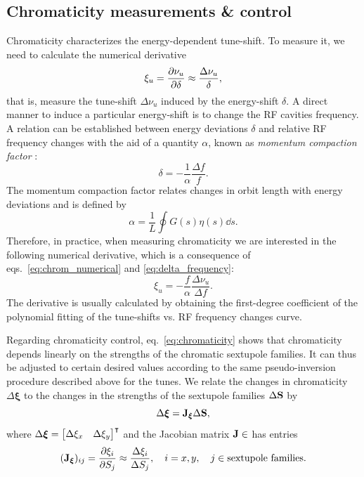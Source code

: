 \subsection{Chromaticity measurements \& control}
Chromaticity characterizes the energy-dependent tune-shift. To measure it, we need to calculate the numerical derivative
\begin{equation}
    \xi_u = \pdv{\nu_u}{\delta}\approx \frac{\Delta \nu_u}{\delta},
    \label{eq:chrom_numerical}
\end{equation}
that is, measure the tune-shift $\Delta \nu_u$ induced by the energy-shift $\delta$. A direct manner to induce a particular energy-shift is to change the RF cavities frequency. A relation can be established between energy deviations $\delta$ and relative RF frequency changes with the aid of a quantity $\alpha$, known as \textit{momentum compaction factor} \cite{lee_accelerator_2004,sands_physics_1969}:
\begin{equation}
    \delta = -\frac{1}{\alpha}\frac{\Delta f}{f}.
    \label{eq:delta_frequency}
\end{equation}
The momentum compaction factor relates changes in orbit length with energy deviations and is defined by
\begin{equation}
    \alpha = \frac{1}{L}\oint G(s) \eta(s) \dd{s}.
\end{equation}
Therefore, in practice, when measuring chromaticity we are interested in the following numerical derivative, which is a consequence of eqs.~\eqref{eq:chrom_numerical} and \eqref{eq:delta_frequency}:
\begin{equation}
\xi_u = -\frac{f}{\alpha}\frac{\Delta \nu_u}{\Delta f}.
\end{equation}
The derivative is usually calculated by obtaining the first-degree coefficient of the polynomial fitting of the tune-shifts vs. RF frequency changes curve.

Regarding chromaticity control, eq.~\eqref{eq:chromaticity} shows that chromaticity depends linearly on the strengths of the chromatic sextupole families. It can thus be adjusted to certain desired values according to the same pseudo-inversion procedure described above for the tunes. We relate the changes in chromaticity $\Delta \boldsymbol{\xi}$ to the changes in the strengths of the sextupole families $\Delta \vb{S}$ by
\begin{equation}
    \Delta\boldsymbol{\xi} = \vb{J}_{\boldsymbol{\xi}}\Delta \vb{S},
\end{equation}
where $\Delta\boldsymbol{\xi} = \mqty*[\Delta \xi_x & \Delta \xi_y]^\intercal$ and the Jacobian matrix $\vb{J}\in$ has entries
\begin{equation}
    (\vb{J}_{\boldsymbol{\xi}})_{ij} = \pdv{\xi_{i}}{S_j} \approx \frac{\Delta \xi_{i}}{\Delta S_j},\quad i=x, y, \quad j\in\text{sextupole families}.
\end{equation}

